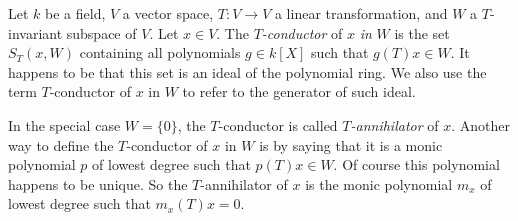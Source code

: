 \documentclass[12pt]{article}
\begin{document}
Let $k$ be a field, $V$ a vector space, $T:V\to V$ a linear transformation, and $W$ a $T$-invariant subspace of $V$. Let $x \in V$. The \emph{$T$-conductor} of $x$ \emph{in} $W$ is the set $S_T(x, W)$ containing all polynomials $g \in k[X]$ such that $g(T)x \in W$. It happens to be that this set is an ideal of the polynomial ring. We also use the term $T$-conductor of $x$ in $W$ to refer to the generator of such ideal.

In the special case $W=\{0\}$, the $T$-conductor is called \emph{$T$-annihilator} of $x$.
Another way to define the $T$-conductor of $x$ in $W$ is by saying that it is a monic polynomial $p$ of lowest degree such that $p(T)x \in W$. Of course this polynomial happens to be unique. So the $T$-annihilator of $x$ is the monic polynomial $m_x$ of lowest degree such that $m_x(T)x = 0$.
\end{document}
